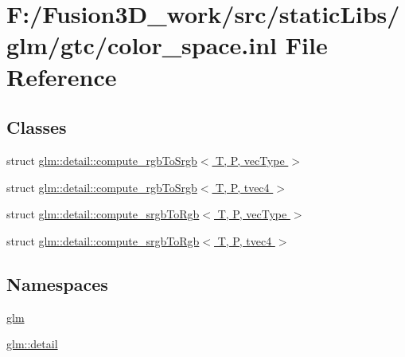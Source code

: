 \hypertarget{gtc_2color__space_8inl}{}\section{F\+:/\+Fusion3\+D\+\_\+work/src/static\+Libs/glm/gtc/color\+\_\+space.inl File Reference}
\label{gtc_2color__space_8inl}
\subsection*{Classes}
\begin{DoxyCompactItemize}
\item 
struct \hyperlink{structglm_1_1detail_1_1compute__rgb_to_srgb}{glm\+::detail\+::compute\+\_\+rgb\+To\+Srgb$<$ T, P, vec\+Type $>$}
\item 
struct \hyperlink{structglm_1_1detail_1_1compute__rgb_to_srgb_3_01_t_00_01_p_00_01tvec4_01_4}{glm\+::detail\+::compute\+\_\+rgb\+To\+Srgb$<$ T, P, tvec4 $>$}
\item 
struct \hyperlink{structglm_1_1detail_1_1compute__srgb_to_rgb}{glm\+::detail\+::compute\+\_\+srgb\+To\+Rgb$<$ T, P, vec\+Type $>$}
\item 
struct \hyperlink{structglm_1_1detail_1_1compute__srgb_to_rgb_3_01_t_00_01_p_00_01tvec4_01_4}{glm\+::detail\+::compute\+\_\+srgb\+To\+Rgb$<$ T, P, tvec4 $>$}
\end{DoxyCompactItemize}
\subsection*{Namespaces}
\begin{DoxyCompactItemize}
\item 
 \hyperlink{namespaceglm}{glm}
\item 
 \hyperlink{namespaceglm_1_1detail}{glm\+::detail}
\end{DoxyCompactItemize}
